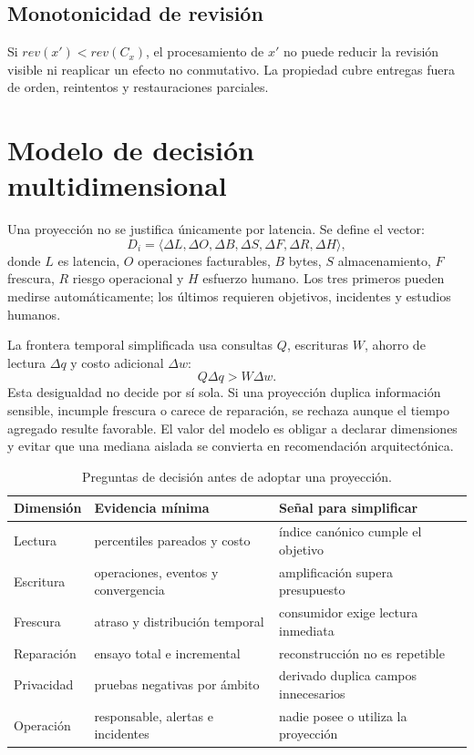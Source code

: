 \documentclass[12pt]{article}
\begin{document}
\subsection{Monotonicidad de revisión}

Si $rev(x')<rev(C_x)$, el procesamiento de $x'$ no puede reducir la revisión visible ni
reaplicar un efecto no conmutativo. La propiedad cubre entregas fuera de orden,
reintentos y restauraciones parciales.

\section{Modelo de decisión multidimensional}

Una proyección no se justifica únicamente por latencia. Se define el vector:
\[
D_i=\langle \Delta L,\Delta O,\Delta B,\Delta S,\Delta F,\Delta R,\Delta H\rangle,
\]
donde $L$ es latencia, $O$ operaciones facturables, $B$ bytes, $S$ almacenamiento,
$F$ frescura, $R$ riesgo operacional y $H$ esfuerzo humano. Los tres primeros pueden
medirse automáticamente; los últimos requieren objetivos, incidentes y estudios humanos.

La frontera temporal simplificada usa consultas $Q$, escrituras $W$, ahorro de lectura
$\Delta q$ y costo adicional $\Delta w$:
\[
Q\Delta q>W\Delta w.
\]
Esta desigualdad no decide por sí sola. Si una proyección duplica información sensible,
incumple frescura o carece de reparación, se rechaza aunque el tiempo agregado resulte
favorable. El valor del modelo es obligar a declarar dimensiones y evitar que una
mediana aislada se convierta en recomendación arquitectónica.

\begin{table}[H]\centering
\caption{Preguntas de decisión antes de adoptar una proyección.}
\begin{tabularx}{\textwidth}{p{3.3cm}X X}\toprule
Dimensión & Evidencia mínima & Señal para simplificar\\\midrule
Lectura & percentiles pareados y costo & índice canónico cumple el objetivo\\
Escritura & operaciones, eventos y convergencia & amplificación supera presupuesto\\
Frescura & atraso y distribución temporal & consumidor exige lectura inmediata\\
Reparación & ensayo total e incremental & reconstrucción no es repetible\\
Privacidad & pruebas negativas por ámbito & derivado duplica campos innecesarios\\
Operación & responsable, alertas e incidentes & nadie posee o utiliza la proyección\\
\bottomrule\end{tabularx}\end{table}
\end{document}
